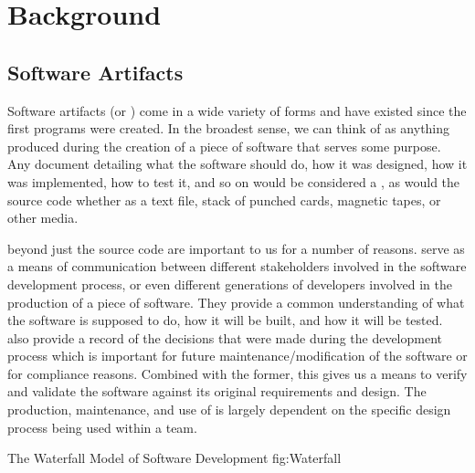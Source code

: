 \chapter{Background}
\label{c:background}
\section{Software Artifacts}
\label{sec:sfs}

Software artifacts (or \sfs{}) come in a wide variety of forms and have existed 
since the first programs were created. In the broadest sense, we can think of 
\sfs{} as anything produced during the creation of a piece of software that 
serves some purpose. Any document detailing what the software should do, how it 
was designed, how it was implemented, how to test it, and so on would be 
considered a \sf{}, as would the source code whether as a text file, stack of 
punched cards, magnetic tapes, or other media.

\SFS{} beyond just the source code are important to us for a number of reasons. 
\SFS{} serve as a means of communication between different stakeholders 
involved in the software development process, or even different generations of 
developers involved in the production of a piece of software. They provide a 
common understanding of what the software is supposed to do, how it will be 
built, and how it will be tested. \SFS{} also provide a record of the decisions 
that were made during the development process which is important for future 
maintenance/modification of the software or for compliance reasons. Combined 
with the former, this gives us a means to verify and validate the software 
against its original requirements and design. The production, maintenance, and 
use of \sfs{} is largely dependent on the specific design process being used 
within a team.

{The Waterfall Model of Software Development}
{fig:Waterfall}

